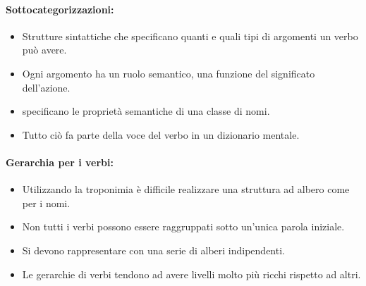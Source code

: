\paragraph{Sottocategorizzazioni:}

\begin{itemize}
  \item Strutture sintattiche che specificano quanti e quali tipi di argomenti un verbo può avere. 
  \item Ogni argomento ha un ruolo semantico, una funzione del significato dell'azione. 
  \item {} specificano le proprietà semantiche di una classe di nomi. 
  \item Tutto ciò fa parte della voce del verbo in un dizionario mentale.
\end{itemize}



\paragraph{Gerarchia per i verbi:}

\begin{itemize}
  \item Utilizzando la troponimia è difficile realizzare una struttura ad albero come per i nomi.  
  \item Non tutti i verbi possono essere raggruppati sotto un'unica parola iniziale.
  \item Si devono rappresentare con una serie di alberi indipendenti. 
  \item Le gerarchie di verbi tendono ad avere livelli molto più ricchi rispetto ad altri. 
\end{itemize}

